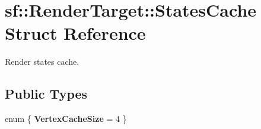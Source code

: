 \hypertarget{structsf_1_1_render_target_1_1_states_cache}{}\section{sf\+:\+:Render\+Target\+:\+:States\+Cache Struct Reference}
\label{structsf_1_1_render_target_1_1_states_cache}


Render states cache.  


\subsection*{Public Types}
\begin{DoxyCompactItemize}
\item 
\mbox{\label{structsf_1_1_render_target_1_1_states_cache_a89d6f52e08c7c16ec29738c0a6f8d5cd}} 
enum \{ {\bfseries Vertex\+Cache\+Size} = 4
 \}
\end{DoxyCompactItemize}
